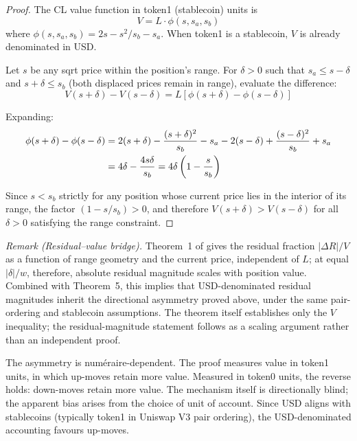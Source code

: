\documentclass[11pt,a4paper]{article}
\theoremstyle{definition}
\begin{document}
\begin{proof}
The CL value function in token1 (stablecoin) units \citep[eq.~3]{ryan2026a} is
\begin{equation}
V = L \cdot \phi(s, s_a, s_b)
\end{equation}
where $\phi(s, s_a, s_b) = 2s - s^2/s_b - s_a$. When token1 is a stablecoin, $V$ is already denominated in USD.

Let $s$ be any sqrt price within the position's range. For $\delta > 0$ such that $s_a \leq s - \delta$ and $s + \delta \leq s_b$ (both displaced prices remain in range), evaluate the difference:
\begin{equation}
V(s + \delta) - V(s - \delta) = L\left[\phi(s + \delta) - \phi(s - \delta)\right]
\end{equation}

Expanding:
\begin{align}
\phi(s + \delta) - \phi(s - \delta) &= 2(s + \delta) - \frac{(s + \delta)^2}{s_b} - s_a - 2(s - \delta) + \frac{(s - \delta)^2}{s_b} + s_a \notag \\
&= 4\delta - \frac{4s\delta}{s_b} = 4\delta\left(1 - \frac{s}{s_b}\right)
\end{align}

Since $s < s_b$ strictly for any position whose current price lies in the interior of its range, the factor $(1 - s/s_b) > 0$, and therefore $V(s + \delta) > V(s - \delta)$ for all $\delta > 0$ satisfying the range constraint.
\end{proof}

\noindent\textit{Remark (Residual--value bridge).} Theorem~1 of \citet{ryan2026a} gives the residual fraction $|\Delta R|/V$ as a function of range geometry and the current price, independent of $L$; at equal $|\delta|/w$, therefore, absolute residual magnitude scales with position value. Combined with Theorem~5, this implies that USD-denominated residual magnitudes inherit the directional asymmetry proved above, under the same pair-ordering and stablecoin assumptions. The theorem itself establishes only the $V$ inequality; the residual-magnitude statement follows as a scaling argument rather than an independent proof.

The asymmetry is numéraire-dependent. The proof measures value in token1 units, in which up-moves retain more value. Measured in token0 units, the reverse holds: down-moves retain more value. The mechanism itself is directionally blind; the apparent bias arises from the choice of unit of account. Since USD aligns with stablecoins (typically token1 in Uniswap V3 pair ordering), the USD-denominated accounting favours up-moves.
\end{document}
